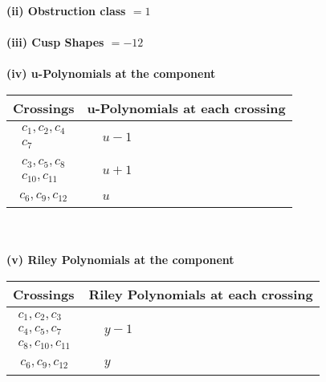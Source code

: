 \documentclass[1p]{elsarticle_modified}
\theoremstyle{definition}
\begin{document}
\flushleft \textbf{(ii) Obstruction class $= 1$}\\~\\
\flushleft \textbf{(iii) Cusp Shapes $= -12$}\\~\\
\newpage\renewcommand{\arraystretch}{1}
\flushleft \textbf{(iv) u-Polynomials at the component}\newline \\
\begin{tabular}{m{50pt}|m{274pt}}
Crossings & \hspace{64pt}u-Polynomials at each crossing \\
\hline $$\begin{aligned}c_{1},c_{2},c_{4}\\c_{7}\end{aligned}$$&$\begin{aligned}
&u-1
\end{aligned}$\\
\hline $$\begin{aligned}c_{3},c_{5},c_{8}\\c_{10},c_{11}\end{aligned}$$&$\begin{aligned}
&u+1
\end{aligned}$\\
\hline $$\begin{aligned}c_{6},c_{9},c_{12}\end{aligned}$$&$\begin{aligned}
&u
\end{aligned}$\\
\hline
\end{tabular}\\~\\
\newpage\renewcommand{\arraystretch}{1}
\flushleft \textbf{(v) Riley Polynomials at the component}\newline \\
\begin{tabular}{m{50pt}|m{274pt}}
Crossings & \hspace{64pt}Riley Polynomials at each crossing \\
\hline $$\begin{aligned}c_{1},c_{2},c_{3}\\c_{4},c_{5},c_{7}\\c_{8},c_{10},c_{11}\end{aligned}$$&$\begin{aligned}
&y-1
\end{aligned}$\\
\hline $$\begin{aligned}c_{6},c_{9},c_{12}\end{aligned}$$&$\begin{aligned}
&y
\end{aligned}$\\
\hline
\end{tabular}\\~\\
\end{document}
